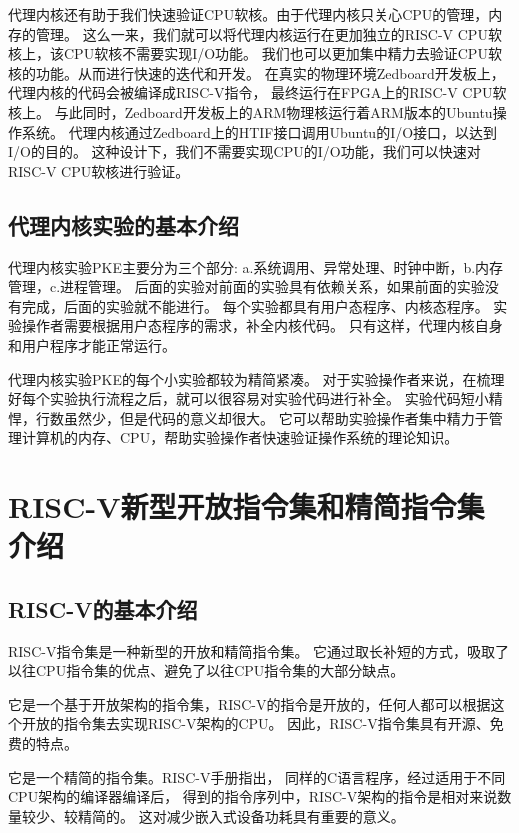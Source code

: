 代理内核还有助于我们快速验证CPU软核。由于代理内核只关心CPU的管理，内存的管理。
这么一来，我们就可以将代理内核运行在更加独立的RISC-V CPU软核上，该CPU软核不需要实现I/O功能。
我们也可以更加集中精力去验证CPU软核的功能。从而进行快速的迭代和开发。
在真实的物理环境Zedboard开发板上，
代理内核的代码会被编译成RISC-V指令，
最终运行在FPGA上的RISC-V CPU软核上。
与此同时，Zedboard开发板上的ARM物理核运行着ARM版本的Ubuntu操作系统。
代理内核通过Zedboard上的HTIF接口调用Ubuntu的I/O接口，以达到I/O的目的。
这种设计下，我们不需要实现CPU的I/O功能，我们可以快速对RISC-V CPU软核进行验证\cite{郭勇2019RISC}。

\subsection{代理内核实验的基本介绍}

代理内核实验PKE主要分为三个部分:
a.系统调用、异常处理、时钟中断，b.内存管理，c.进程管理。
后面的实验对前面的实验具有依赖关系，如果前面的实验没有完成，后面的实验就不能进行。
每个实验都具有用户态程序、内核态程序。
实验操作者需要根据用户态程序的需求，补全内核代码。
只有这样，代理内核自身和用户程序才能正常运行。

代理内核实验PKE的每个小实验都较为精简紧凑。
对于实验操作者来说，在梳理好每个实验执行流程之后，就可以很容易对实验代码进行补全。
实验代码短小精悍，行数虽然少，但是代码的意义却很大。
它可以帮助实验操作者集中精力于管理计算机的内存、CPU，帮助实验操作者快速验证操作系统的理论知识。


\section{RISC-V新型开放指令集和精简指令集介绍}

\subsection{RISC-V的基本介绍}

RISC-V指令集是一种新型的开放和精简指令集。
它通过取长补短的方式，吸取了以往CPU指令集的优点、避免了以往CPU指令集的大部分缺点。

它是一个基于开放架构的指令集，RISC-V的指令是开放的，任何人都可以根据这个开放的指令集去实现RISC-V架构的CPU。
因此，RISC-V指令集具有开源、免费的特点。

它是一个精简的指令集。RISC-V手册指出，
同样的C语言程序\cite{2006IEEE}，经过适用于不同CPU架构的编译器编译后，
得到的指令序列中，RISC-V架构的指令是相对来说数量较少、较精简的。
这对减少嵌入式设备功耗具有重要的意义\cite{2014The}。

